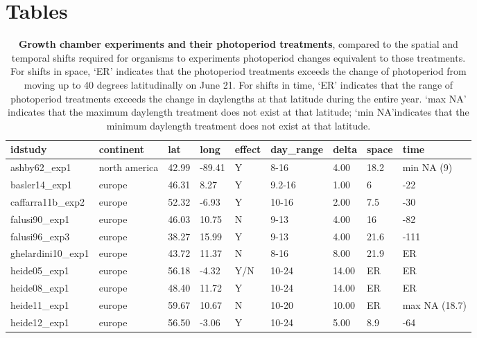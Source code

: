 \documentclass{article}
\begin{document}
\section* {Tables}
\begin{table}[ht]
\centering
\caption{\textbf{Growth chamber experiments and their photoperiod treatments}, compared to the spatial and temporal shifts required for organisms to experiments photoperiod changes equivalent to those treatments. For shifts in space, `ER' indicates that the photoperiod treatments exceeds the change of photoperiod from moving up to 40 degrees latitudinally on June 21. For shifts in time, `ER' indicates that the range of photoperiod treatments exceeds the change in daylengths at that latitude during the entire year. `max NA' indicates that the maximum daylength treatment does not exist at that latitude; `min NA'indicates that the minimum daylength treatment does not exist at that latitude.} 
\label{table:phototreats}
\begin{tabular}{|p{}|p{}|p{}|p{}|p{}|p{}|p{}|p{}|p{}|}
  \hline
idstudy & continent & lat & long & effect & day\_range & delta & space & time \\ 
  \hline
ashby62\_exp1 & north america & 42.99 & -89.41 & Y & 8-16 & 4.00 & 18.2 & min NA (9) \\ 
  basler14\_exp1 & europe & 46.31 & 8.27 & Y & 9.2-16 & 1.00 & 6 & -22 \\ 
  caffarra11b\_exp2 & europe & 52.32 & -6.93 & Y & 10-16 & 2.00 & 7.5 & -30 \\ 
  falusi90\_exp1 & europe & 46.03 & 10.75 & N & 9-13 & 4.00 & 16 & -82 \\ 
  falusi96\_exp3 & europe & 38.27 & 15.99 & Y & 9-13 & 4.00 & 21.6 & -111 \\ 
  ghelardini10\_exp1 & europe & 43.72 & 11.37 & N & 8-16 & 8.00 & 21.9 & ER \\ 
  heide05\_exp1 & europe & 56.18 & -4.32 & Y/N & 10-24 & 14.00 & ER & ER \\ 
  heide08\_exp1 & europe & 48.40 & 11.72 & Y & 10-24 & 14.00 & ER & ER \\ 
  heide11\_exp1 & europe & 59.67 & 10.67 & N & 10-20 & 10.00 & ER & max NA (18.7) \\ 
  heide12\_exp1 & europe & 56.50 & -3.06 & Y & 10-24 & 5.00 & 8.9 & -64 \\ 

\end{tabular}
\end{table}
\end{document}
